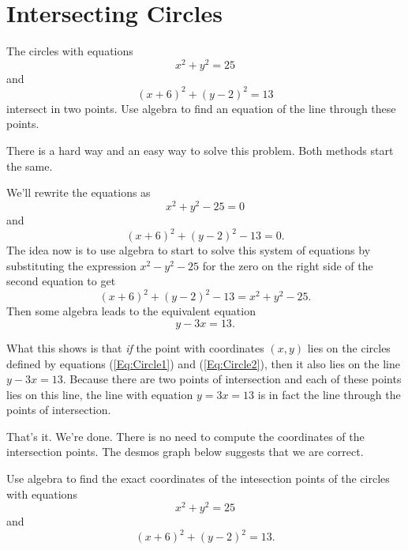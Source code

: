 \documentclass{ximera}
\begin{document}
\fi          %


\section*{Intersecting Circles}

\begin{example} \label{Ex4b}
The circles with equations
\[
    x^2 + y^2 = 25
\]
and 
\[
   (x+6)^2 + (y-2)^2=13
\]
intersect in two points. Use algebra to find an equation of the line through these points.
\end{example}

\begin{explanation}

There is a hard way and an easy way to solve this problem. Both methods start the same.

We'll rewrite the equations as
\begin{equation}
  x^2 + y^2 - 25 = 0   \label{Eq:Circle1}
\end{equation}
and
\begin{equation}
  (x+6)^2 + (y-2)^2-13 = 0 .   \label{Eq:Circle2}
\end{equation}
The idea now is to use algebra to start to solve this system of equations by substituting the expression $x^2-y^2-25$ for the zero on the right side of the second equation to get
\[
        (x+6)^2 + (y-2)^2-13 = x^2 + y^2 -25 .
\]
Then some algebra leads to the equivalent equation
\[
   y-3x = 13.
\]

What this shows is that \emph{if} the point with coordinates $(x,y)$ lies on the circles defined by equations (\ref{Eq:Circle1}) and (\ref{Eq:Circle2}), then it also lies on the line $y-3x = 13$. Because there are two points of intersection and each of these points lies on this line, the line with equation $y=3x=13$ is in fact the line through the points of intersection.

That's it. We're done. There is no need to compute the coordinates of the intersection points. The desmos graph below suggests that we are correct.

\begin{onlineOnly}
    \begin{center}
\end{center}
\end{onlineOnly}


\begin{question}  \label{Q435rrtnhgh}
Use algebra to find the exact coordinates of the intesection points of the circles with equations
\[
    x^2 + y^2 = 25
\]
and 
\[
   (x+6)^2 + (y-2)^2=13 .
\]


\end{question}
\end{explanation}
\end{document}

